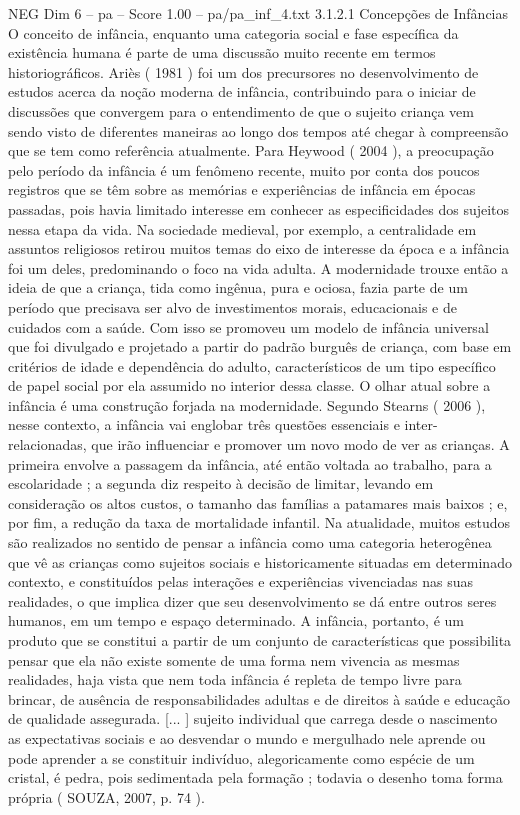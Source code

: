 \begin{textsample}{NEG Dim 6 – pa – Score 1.00 – pa/pa\_inf\_4.txt}  \label{ex:f6_neg_229}
3.1.2.1 Concepções de Infâncias O conceito de infância, enquanto uma categoria social e fase específica da existência humana é parte de uma discussão muito recente em termos historiográficos.
Ariès ( 1981 ) foi um dos precursores no desenvolvimento de estudos acerca da noção moderna de infância, contribuindo para o iniciar de discussões que convergem para o entendimento de que o sujeito criança vem sendo visto de diferentes maneiras ao longo dos tempos até chegar à compreensão que se tem como referência atualmente.
Para Heywood ( 2004 ), a preocupação pelo período da infância é um fenômeno recente, muito por conta dos poucos registros que se têm sobre as memórias e experiências de infância em épocas passadas, pois havia limitado interesse em conhecer as especificidades dos sujeitos nessa etapa da vida.
Na sociedade medieval, por exemplo, a centralidade em assuntos religiosos retirou muitos temas do eixo de interesse da época e a infância foi um deles, predominando o foco na vida adulta.
A modernidade trouxe então a ideia de que a criança, tida como ingênua, pura e ociosa, fazia parte de um período que precisava ser alvo de investimentos morais, educacionais e de cuidados com a saúde.
Com isso se promoveu um modelo de infância universal que foi divulgado e projetado a partir do padrão burguês de criança, com base em critérios de idade e dependência do adulto, característicos de um tipo específico de papel social por ela assumido no interior dessa classe.
O olhar atual sobre a infância é uma construção forjada na modernidade.
Segundo Stearns ( 2006 ), nesse contexto, a infância vai englobar três questões essenciais e inter-relacionadas, que irão influenciar e promover um novo modo de ver as crianças.
A primeira envolve a passagem da infância, até então voltada ao trabalho, para a escolaridade ; a segunda diz respeito à decisão de limitar, levando em consideração os altos custos, o tamanho das famílias a patamares mais baixos ; e, por fim, a redução da taxa de mortalidade infantil.
Na atualidade, muitos estudos são realizados no sentido de pensar a infância como uma categoria heterogênea que vê as crianças como sujeitos sociais e historicamente situadas em determinado contexto, e constituídos pelas interações e experiências vivenciadas nas suas realidades, o que implica dizer que seu desenvolvimento se dá entre outros seres humanos, em um tempo e espaço determinado.
A infância, portanto, é um produto que se constitui a partir de um conjunto de características que possibilita pensar que ela não existe somente de uma forma nem vivencia as mesmas realidades, haja vista que nem toda infância é repleta de tempo livre para brincar, de ausência de responsabilidades adultas e de direitos à saúde e educação de qualidade assegurada. [... ] sujeito individual que carrega desde o nascimento as expectativas sociais e ao desvendar o mundo e mergulhado nele aprende ou pode aprender a se constituir indivíduo, alegoricamente como espécie de um cristal, é pedra, pois sedimentada pela formação ; todavia o desenho toma forma própria ( SOUZA, 2007, p. 74 ).

\end{textsample}
